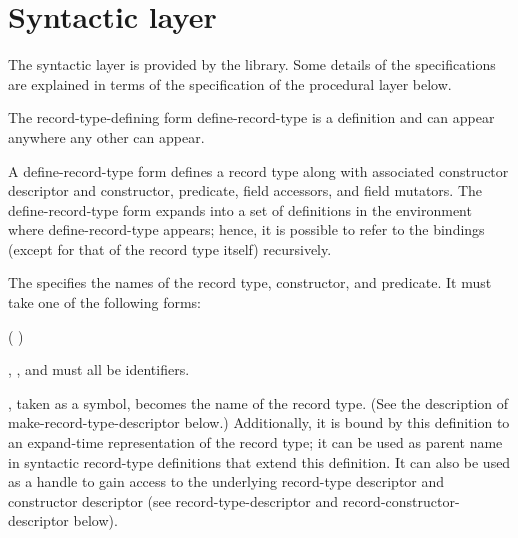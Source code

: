 \section{Syntactic layer}
\label{recordssyntacticsection}

The syntactic layer is provided by the  library.  Some details of the specifications are
explained in terms of the specification of the procedural layer below.

The record-type-defining form {\cf define-record-type} is a definition and
can appear anywhere any other  can appear.

\begin{entry}{%
}

A {\cf define-record-type} form defines a record type along with
associated constructor descriptor and constructor, predicate, field
accessors, and field mutators. The {\cf define-record-type} form expands into
a set of definitions in the environment where {\cf define-record-type}
appears; hence, it is possible to refer to the bindings (except for
that of the record type itself) recursively.

The  specifies the names of the record type,
constructor, and predicate. It must take one of the following
forms:

\begin{scheme}
(  )
\end{scheme}

, , and  must all be identifiers.

, taken as a symbol, becomes the name of the record
type. (See the description of {\cf make-record-type-descriptor}
below.)
Additionally, it is bound by this definition to an expand-time
representation of the record type; it can be used as parent name in
syntactic record-type definitions that extend this definition. It can
also be used as a handle to gain access to the underlying record-type
descriptor and constructor descriptor (see {\cf
  record-type-descriptor} and {\cf record-constructor-descriptor}
below).


\end{entry}
